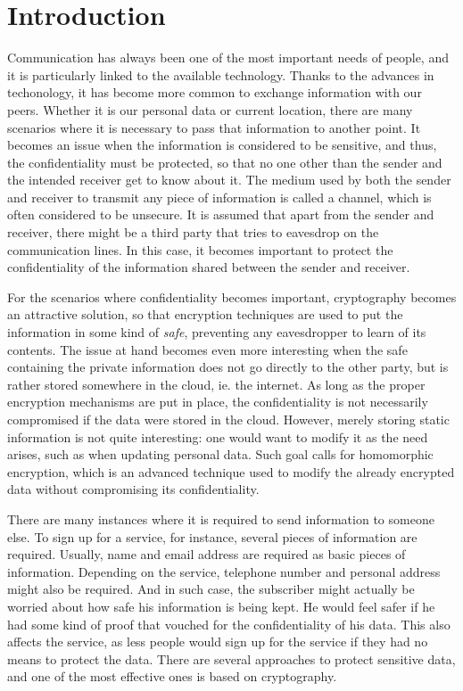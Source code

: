\chapter{Introduction}
\label{intro}

Communication has always been one of the most important needs of people, and it is particularly linked to the available technology. Thanks to the advances in techonology, it has become more common to exchange information with our peers. Whether it is our personal data or current location, there are many scenarios where it is necessary to pass that information to another point. It becomes an issue when the information is considered to be sensitive, and thus, the confidentiality must be protected, so that no one other than the sender and the intended receiver get to know about it. The medium used by both the sender and receiver to transmit any piece of information is called a channel, which is often considered to be unsecure. It is assumed that apart from the sender and receiver, there might be a third party that tries to eavesdrop on the communication lines. In this case, it becomes important to protect the confidentiality of the information shared between the sender and receiver. 

For the scenarios where confidentiality becomes important, cryptography becomes an attractive solution, so that encryption techniques are used to put the information in some kind of \emph{safe}, preventing any eavesdropper to learn of its contents. The issue at hand becomes even more interesting when the safe containing the private information does not go directly to the other party, but is rather stored somewhere in the cloud, ie. the internet. As long as the proper encryption mechanisms are put in place, the confidentiality is not necessarily compromised if the data were stored in the cloud. However, merely storing static information is not quite interesting: one would want to modify it as the need arises, such as when updating personal data. Such goal calls for homomorphic encryption, which is an advanced technique used to modify the already encrypted data without compromising its confidentiality.

There are many instances where it is required to send information to someone else. To sign up for a service, for instance, several pieces of information are required. Usually, name and email address are required as basic pieces of information. Depending on the service, telephone number and personal address might also be required. And in such case, the subscriber might actually be worried about how safe his information is being kept. He would feel safer if he had some kind of proof that vouched for the confidentiality of his data. This also affects the service, as less people would sign up for the service if they had no means to protect the data. There are several approaches to protect sensitive data, and one of the most effective ones is based on cryptography.

